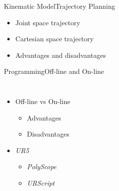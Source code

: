 \begin{frame}{Kinematic Model}{Trajectory Planning}
\begin{itemize}
    \item Joint space trajectory
    \item Cartesian space trajectory
    \item Advantages and disadvantages
\end{itemize}
\end{frame}

\begin{frame}{Programming}{Off-line and On-line}
\begin{columns}
\begin{itemize}
    \item Off-line vs On-line
    \begin{itemize}
        \item Advantages
        \item Disadvantages
    \end{itemize}
    \item \textit{UR5}
    \begin{itemize}
        \item \textit{PolyScope}
        \item \textit{URScript}
    \end{itemize}
\end{itemize}
\end{columns}
\end{frame}

